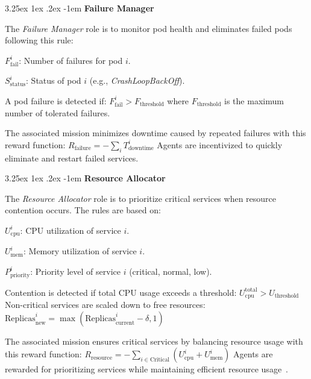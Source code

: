 \documentclass[conference]{IEEEtran}
\makeatletter
\renewcommand\paragraph{\@startsection{paragraph}{5}{\z@}%
  {3.25ex \@plus1ex \@minus.2ex}%
  {-1em}%
  {\normalfont\normalsize\bfseries}}
\makeatother
\begin{document}
\noindent \paragraph{\textbf{Failure Manager}}

The \textit{Failure Manager} role is to monitor pod health and eliminates failed pods following this rule:
\begin{enumerate*}[label={}, itemjoin={;\quad }]
    \item \( F_{\text{fail}}^i \): Number of failures for pod \( i \).
    \item \( S_{\text{status}}^i \): Status of pod \( i \) (e.g., \textit{CrashLoopBackOff}).
\end{enumerate*}
A pod failure is detected if:
$F_{\text{fail}}^i > F_{\text{threshold}}$
where \( F_{\text{threshold}} \) is the maximum number of tolerated failures.

The associated mission minimizes downtime caused by repeated failures with this reward function:
$R_{\text{failure}} = - \sum_{i} T_{\text{downtime}}^i$
Agents are incentivized to quickly eliminate and restart failed services.

\noindent \paragraph{\textbf{Resource Allocator}}

The \textit{Resource Allocator} role is to prioritize critical services when resource contention occurs. The rules are based on:
\begin{enumerate*}[label={}, itemjoin={;\quad }]
    \item \( U_{\text{cpu}}^i \): CPU utilization of service \( i \).
    \item \( U_{\text{mem}}^i \): Memory utilization of service \( i \).
    \item \( P_{\text{priority}}^i \): Priority level of service \( i \) (critical, normal, low).
\end{enumerate*}
Contention is detected if total CPU usage exceeds a threshold:
$U_{\text{cpu}}^{\text{total}} > U_{\text{threshold}}$
Non-critical services are scaled down to free resources:
$\text{Replicas}_{\text{new}}^i = \max\left( \text{Replicas}_{\text{current}}^i - \delta, 1 \right)$

The associated mission ensures critical services by balancing resource usage with this reward function:
$R_{\text{resource}} = - \sum_{i \in \text{Critical}} \left( U_{\text{cpu}}^i + U_{\text{mem}}^i \right)$
Agents are rewarded for prioritizing services while maintaining efficient resource usage~\cite{shahrad2020resource}.
\end{document}
